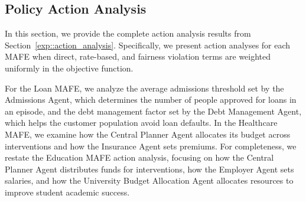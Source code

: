 \label{Sec::Experiments_ext}

\subsection{Policy Action Analysis}
\label{sec::action_analysis_appendix}

In this section, we provide the complete action analysis results from Section~\ref{exp::action_analysis}. Specifically, we present action analyses for each MAFE when direct, rate-based, and fairness violation terms are weighted uniformly in the objective function.

For the Loan MAFE, we analyze the average admissions threshold set by the Admissions Agent, which determines the number of people approved for loans in an episode, and the debt management factor set by the Debt Management Agent, which helps the customer population avoid loan defaults. In the Healthcare MAFE, we examine how the Central Planner Agent allocates its budget across interventions and how the Insurance Agent sets premiums. For completeness, we restate the Education MAFE action analysis, focusing on how the Central Planner Agent distributes funds for interventions, how the Employer Agent sets salaries, and how the University Budget Allocation Agent allocates resources to improve student academic success.

